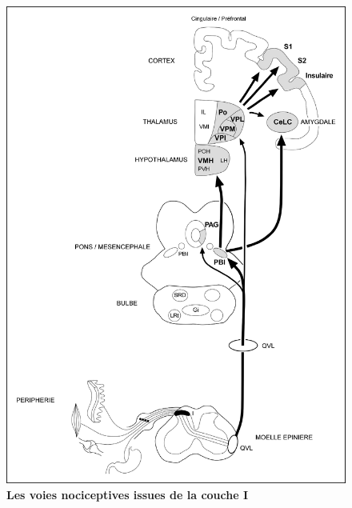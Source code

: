 \documentclass[a4paper,12pt,twoside]{report}
\begin{document}
\begin{figure}[p]

\begin{center}
 \includegraphics[scale=0.75]{Figure2.jpg} 
\end{center}

\caption{\textbf{Les voies nociceptives issues de la couche I}}


\end{figure}
\end{document}
